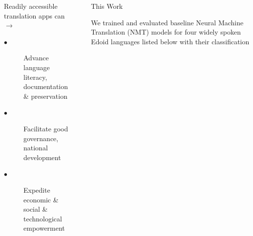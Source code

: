 \documentclass[final]{beamer}
\newlength{\sepwid}
\newlength{\onecolwid}
\begin{document}
\begin{frame}[t]
\begin{columns}[t]
\begin{column}{\onecolwid}
\begin{block}{}
\vspace{5mm}

Readily accessible translation apps can $\rightarrow$
\begin{description}
  \item[$\bullet$] Advance language literacy, documentation \& preservation
  \item[$\bullet$] Facilitate good governance, national development 
  \item[$\bullet$] Expedite economic \& social \& technological empowerment
\end{description}
\end{block}

\vspace{5mm}

\end{column} %

\begin{column}{\sepwid}\end{column} %

\begin{column}{\onecolwid}


\begin{block}{This Work}

We trained and evaluated baseline Neural Machine Translation (NMT) models for four widely spoken Edoid languages listed below with their classification
\vspace{10mm}

% 






\end{block}
\end{column}
\end{columns}
\end{frame}
\end{document}
